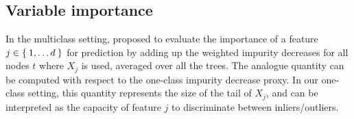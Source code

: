 \subsection{Variable importance}
In the multiclass setting, \citet{Breiman2001} proposed to evaluate the
importance of a feature $j \in \Set{1,\ldots d}$ for prediction by
adding up the weighted impurity decreases
for all nodes $t$ where $X_j$ is used, averaged over all the trees. The
analogue quantity can be computed with respect to the one-class impurity
decrease proxy.
In our one-class setting, this quantity represents the size of the tail of
$X_j$, and can be interpreted as the capacity of feature $j$ to discriminate
between inliers/outliers.
